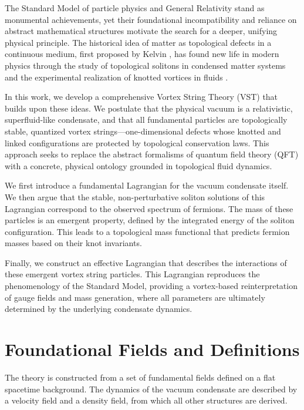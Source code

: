 \documentclass[a4paper,12pt]{article}
\begin{document}
    The Standard Model of particle physics and General Relativity stand as monumental achievements, yet their foundational incompatibility and reliance on abstract mathematical structures motivate the search for a deeper, unifying physical principle. The historical idea of matter as topological defects in a continuous medium, first proposed by Kelvin \cite{Kelvin1867}, has found new life in modern physics through the study of topological solitons in condensed matter systems \cite{Volovik2003} and the experimental realization of knotted vortices in fluids \cite{Kleckner2013}.

    In this work, we develop a comprehensive Vortex String Theory (VST) that builds upon these ideas. We postulate that the physical vacuum is a relativistic, superfluid-like condensate, and that all fundamental particles are topologically stable, quantized vortex strings—one-dimensional defects whose knotted and linked configurations are protected by topological conservation laws. This approach seeks to replace the abstract formalisms of quantum field theory (QFT) with a concrete, physical ontology grounded in topological fluid dynamics.

    We first introduce a fundamental Lagrangian for the vacuum condensate itself. We then argue that the stable, non-perturbative soliton solutions of this Lagrangian correspond to the observed spectrum of fermions. The mass of these particles is an emergent property, defined by the integrated energy of the soliton configuration. This leads to a topological mass functional that predicts fermion masses based on their knot invariants.

    Finally, we construct an effective Lagrangian that describes the interactions of these emergent vortex string particles. This Lagrangian reproduces the phenomenology of the Standard Model, providing a vortex-based reinterpretation of gauge fields and mass generation, where all parameters are ultimately determined by the underlying condensate dynamics.

    \section{Foundational Fields and Definitions}

    The theory is constructed from a set of fundamental fields defined on a flat spacetime background. The dynamics of the vacuum condensate are described by a velocity field and a density field, from which all other structures are derived.
\end{document}

